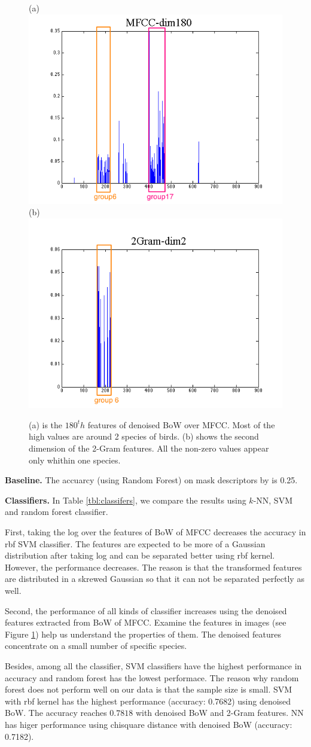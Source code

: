 \documentclass{article} %
\begin{document}
\begin{figure}[b!]
    \centering
    {(a)\includegraphics[width=0.40\linewidth]{../Figure/mfcc_180.png}
    (b)\includegraphics[width=0.43\linewidth]{../Figure/ngram_202.png}}
    \caption{(a) is the $180^th$ features of denoised BoW over MFCC. Most of the high values are around 2 species of birds. (b) shows the second dimension of the 2-Gram features. All the non-zero values appear only whithin one species.}
    \label{fig:features}
\end{figure}
\textbf{Baseline.}
The accuarcy (using Random Forest) on mask descriptors by \cite{mlsp1} is 0.25. 

\textbf{Classifiers.}
In Table \ref{tbl:classifers}, we compare the results using $k$-NN, SVM and random forest classifier. 

First, taking the log over the features of BoW of MFCC decreases the accuracy in rbf SVM classifier. The features are expected to be more of a Gaussian distribution after taking log and can be separated better using rbf kernel. However, the performance decreases. The reason is that the transformed features are distributed in a skrewed Gaussian so that it can not be separated perfectly as well.

Second, the performance of all kinds of classifier increases using the denoised features extracted from BoW of MFCC. Examine the features in images (see Figure \ref{fig:features}) help us understand the properties of them. The denoised features concentrate on a small number of specific species. 

Besides, among all the classifier, SVM classifiers have the highest performance in accuracy and random forest has the lowest performace. The reason why random forest does not perform well on our data is that the sample size is small. SVM with rbf kernel has the highest performance (accuracy: 0.7682) using denoised BoW. The accuracy reaches $0.7818$ with denoised BoW and 2-Gram features. NN has higer performance using chisquare distance with denoised BoW (accuracy: 0.7182).
\end{document}
